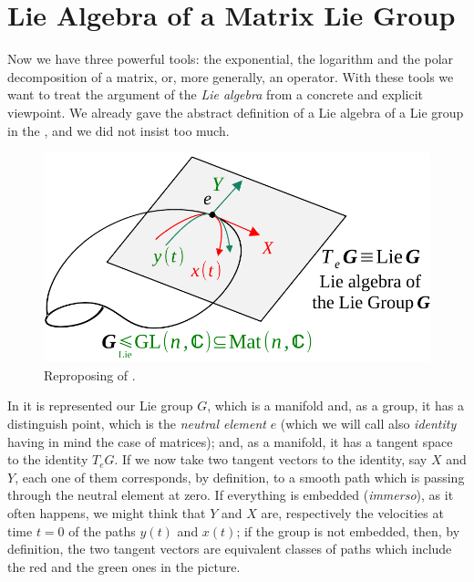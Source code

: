 \documentclass[../main.tex]{subfiles}
\begin{document}
\setchapterpreamble[u]{\margintoc}
\chapter[Lie Algebra of a Matrix Lie Group]{Lie Algebra of a Matrix Lie Group\footnotemark[0]}
Now we have three powerful tools: the exponential, the logarithm and the polar decomposition of a matrix, or, more generally, an operator. With these tools we want to treat the argument of the \textit{Lie algebra} from a concrete and explicit viewpoint. We already gave the abstract definition of a Lie algebra of a Lie group in the , and we did not insist too much.
\begin{figure}[h!]
    \includegraphics[width=1\textwidth]{images/inf-struct-lie-group2.pdf}
    \caption{Reproposing of .}
\end{figure}
In  it is represented our Lie group $G$, which is a manifold and, as a group, it has a distinguish point, which is the \textit{neutral element} $e$ (which we will call also \textit{identity} having in mind the case of matrices); and, as a manifold, it has a tangent space to the identity $T_eG$. If we now take two tangent vectors to the identity, say $X$ and $Y$, each one of them corresponds, by definition, to a smooth path which is passing through the neutral element at zero. If everything is embedded (\textit{immerso}), as it often happens, we might think that $Y$ and $X$ are, respectively the velocities at time $t=0$ of the paths $y(t)$ and $x(t)$; if the group is not embedded, then, by definition, the two tangent vectors are equivalent classes of paths which include the red and the green ones in the picture. 
\end{document}
